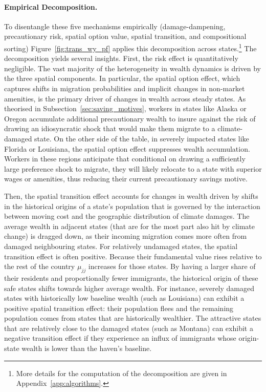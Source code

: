 \documentclass[11pt, a4paper]{article}
\begin{document}
\paragraph{Empirical Decomposition.} To disentangle these five mechanisms empirically (damage-dampening, precautionary risk, spatial option value, spatial transition, and compositional sorting) Figure~\ref{fig:trans_wy_pf} applies this decomposition across states.\footnote{More details for the computation of the decomposition are given in Appendix~\ref{app:algorithms}.} The decomposition yields several insights. First, the risk effect is quantitatively negligible. The vast majority of the heterogeneity in wealth dynamics is driven by the three spatial components. In particular, the spatial option effect, which captures shifts in migration probabilities and implicit changes in non-market amenities, is the primary driver of changes in wealth across steady states. As theorised in Subsection~\ref{sec:saving_motives}, workers in states like Alaska or Oregon accumulate additional precautionary wealth to insure against the risk of drawing an idiosyncratic shock that would make them migrate to a climate-damaged state. On the other side of the table, in severely impacted states like Florida or Louisiana, the spatial option effect suppresses wealth accumulation. Workers in these regions anticipate that conditional on drawing a sufficiently large preference shock to migrate, they will likely relocate to a state with superior wages or amenities, thus reducing their current precautionary savings motive.

Then, the spatial transition effect accounts for changes in wealth driven by shifts in the historical origins of a state's population that is governed by the interaction between moving cost and the geographic distribution of climate damages. The average wealth in adjacent states (that are for the most part also hit by climate change) is dragged down, as their incoming migration comes more often from damaged neighbouring states. For relatively undamaged states, the spatial transition effect is often positive. Because their fundamental value rises relative to the rest of the country $\mu_{jj}$ increases for those states. By having a larger share of their  residents and proportionally fewer immigrants, the historical origin of these safe states shifts towards higher average wealth. For instance, severely damaged states with historically low baseline wealth (such as Louisiana) can exhibit a positive spatial transition effect: their population flees and the remaining population comes from states that are historically wealthier. The attractive states that are relatively close to the damaged states (such as Montana) can exhibit a negative transition effect if they experience an influx of immigrants whose origin-state wealth is lower than the haven's baseline.
\end{document}

